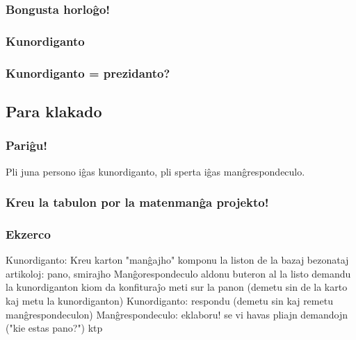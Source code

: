 \documentclass{beamer}
\begin{document}
  \begin{frame}
    \frametitle{Bongusta horloĝo!}
  \end{frame}


  \begin{frame}
    \frametitle{Kunordiganto}
    
  \end{frame}


  \begin{frame}
    \frametitle{Kunordiganto = prezidanto?}
    
  \end{frame}
  
\subsection{Para klakado}
  \begin{frame}
    \frametitle{Pariĝu!}
    Pli juna persono iĝas kunordiganto, pli sperta iĝas manĝrespondeculo.
  \end{frame}

  \begin{frame}
    \frametitle{Kreu la tabulon por la matenmanĝa projekto!}
  \end{frame}

  \begin{frame}
    \frametitle{Ekzerco}
    Kunordiganto:
        Kreu karton "manĝajho"
        komponu la liston de la bazaj bezonataj artikoloj: pano, smirajho
    Manĝorespondeculo
        aldonu buteron al la listo
        demandu la kunordiganton kiom da konfituraĵo meti sur la panon (demetu sin de la karto kaj metu la kunordiganton)
    Kunordiganto:
        respondu (demetu sin kaj remetu manĝrespondeculon)
    Manĝrespondeculo:
        eklaboru! se vi havas pliajn demandojn ("kie estas pano?") ktp
  \end{frame}
\end{document}
